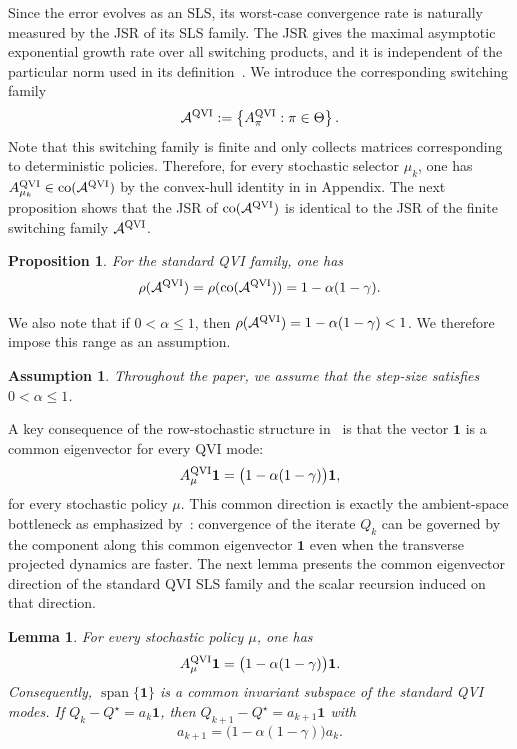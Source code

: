 \documentclass[letterpaper]{article}
\numberwithin{equation}{section}
\newtheorem{assumption}{Assumption}[section]
\newtheorem{proposition}{Proposition}[section]
\newtheorem{lemma}{Lemma}[section]
\newcommand{\co}{\operatorname{co}}
\begin{document}
Since the error evolves as an SLS, its worst-case convergence rate is naturally measured by the JSR of its SLS family. The JSR gives the maximal asymptotic exponential growth rate over all switching products, and it is independent of the particular norm used in its definition~\citep{rota1960note,jungers2009joint}.
We introduce the corresponding switching family
\begin{equation*}
  \mathcal A^{\rm QVI}:=\left\{A_\pi^{\rm QVI}:\pi\in\Theta\right\}.
\end{equation*}
Note that this switching family is finite and only collects matrices corresponding to deterministic policies.
Therefore, for every stochastic selector $\mu_k$, one has
$A_{\mu_k}^{\rm QVI}\in\co(\mathcal A^{\rm QVI})$ by the convex-hull identity in  in Appendix.
The next proposition shows that the JSR of $\co(\mathcal A^{\rm QVI})$ is identical to the JSR of the finite switching family $\mathcal A^{\rm QVI}$.
\begin{proposition}
\label{prop:standard_q_jsr}
For the standard QVI family, one has
\begin{equation}
  \rho(\mathcal A^{\rm QVI})
  =\rho(\co(\mathcal A^{\rm QVI}))
  =1-\alpha(1-\gamma).
  \label{eq:q-jsr}
\end{equation}
\end{proposition}
We also note that if $0<\alpha\le1$, then $\rho(\mathcal A^{\rm QVI})=1-\alpha(1-\gamma)<1$. We therefore impose this range as an assumption.
\begin{assumption}
\label{ass:qvi-alpha-stability}
Throughout the paper, we assume that the step-size satisfies $0<\alpha\le1$.
\end{assumption}
A key consequence of the row-stochastic structure in~ is that the vector $\mathbf{1}$ is a common eigenvector for every QVI mode:
\begin{equation*}
  A_\mu^{\rm QVI}\mathbf{1} =\bigl(1-\alpha(1-\gamma)\bigr)\mathbf{1},
\end{equation*}
for every stochastic policy $\mu$. This common direction is exactly the ambient-space bottleneck as emphasized
by~\citet{lee2026deflated}: convergence of the iterate $Q_k$ can be governed by
the component along this common eigenvector $\mathbf{1}$ even when the transverse projected dynamics are faster.
The next lemma presents the common eigenvector direction of the standard QVI SLS
family and the scalar recursion induced on that direction.
\begin{lemma}
\label{lem:standard-qvi-common-eigenvector}
For every stochastic policy $\mu$, one has
\begin{equation*}
  A_\mu^{\rm QVI}\mathbf{1}
  =\bigl(1-\alpha(1-\gamma)\bigr)\mathbf{1}.
\end{equation*}
Consequently, $\operatorname{span}\{\mathbf{1}\}$ is a common invariant subspace
of the standard QVI modes. If $Q_k-Q^\star=a_k\mathbf{1}$, then
$Q_{k+1}-Q^\star=a_{k+1}\mathbf{1}$ with
\begin{equation*}
  a_{k+1}=\bigl(1-\alpha(1-\gamma)\bigr)a_k.
\end{equation*}
\end{lemma}
\end{document}
